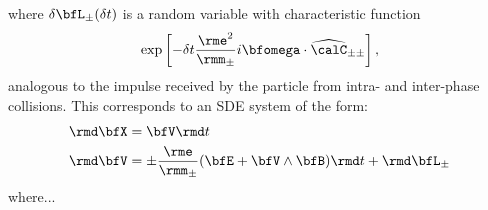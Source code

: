     where $\delta\bfL_{\pm}(\delta t)$ is a random variable with characteristic function
    \begin{equation}
        \exp\left[- \delta t\frac{\rme^{2}}{\rmm_{\pm}}i\bfomega\cdot\widehat{\calC}_{\pm\pm}\right],
    \end{equation}
    analogous to the impulse received by the particle from intra- and inter-phase collisions. This corresponds to an SDE system of the form:
    \begin{align}
        \rmd\bfX  &=  \bfV\rmd t  \\
        \rmd\bfV  &=  \pm\frac{\rme}{\rmm_{\pm}}(\bfE + \bfV\wedge\bfB)\rmd t + \rmd\bfL_{\pm}
    \end{align}
    where...